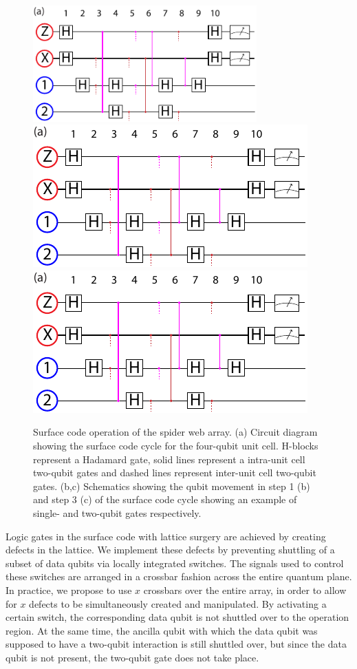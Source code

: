 \documentclass[aps,prl,reprint,superscriptaddress,floatfix]{revtex4-1}
\begin{document}
\begin{figure}
    \centering
    \includegraphics[width=86mm,page=1]{Figure_6_surface_code.pdf}\\
    \includegraphics[page=2]{Figure_6_surface_code.pdf}
    \includegraphics[page=4]{Figure_6_surface_code.pdf}
    \caption{Surface code operation of the spider web array. (a) Circuit diagram showing the surface code cycle for the four-qubit unit cell. H-blocks represent a Hadamard gate, solid lines represent a intra-unit cell two-qubit gates and dashed lines represent inter-unit cell two-qubit gates. (b,c) Schematics showing the qubit movement in step 1 (b) and step 3 (c) of the surface code cycle showing an example of single- and two-qubit gates respectively.}
    \label{fig:surface_code}
\end{figure}

Logic gates in the surface code with lattice surgery are achieved by creating defects in the lattice.
We implement these defects by preventing shuttling of a subset of data qubits via locally integrated switches.
The signals used to control these switches are arranged in a crossbar fashion across the entire quantum plane.
In practice, we propose to use $x$ crossbars over the entire array, in order to allow for $x$ defects to be simultaneously created and manipulated.
By activating a certain switch, the corresponding data qubit is not shuttled over to the operation region.
At the same time, the ancilla qubit with which the data qubit was supposed to have a two-qubit interaction is still shuttled over, but since the data qubit is not present, the two-qubit gate does not take place.
\end{document}
